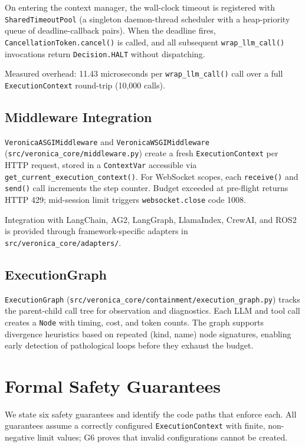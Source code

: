 \documentclass[11pt]{article}
\begin{document}
On entering the context manager, the wall-clock timeout is registered with
\texttt{SharedTimeoutPool} (a singleton daemon-thread scheduler with a
heap-priority queue of deadline-callback pairs). When the deadline fires,
\texttt{CancellationToken.cancel()} is called, and all subsequent
\texttt{wrap\_llm\_call()} invocations return \texttt{Decision.HALT} without
dispatching.

Measured overhead: 11.43 microseconds per \texttt{wrap\_llm\_call()} call
over a full \texttt{ExecutionContext} round-trip (10,000 calls).

\subsection{Middleware Integration}

\texttt{VeronicaASGIMiddleware} and \texttt{VeronicaWSGIMiddleware}
(\texttt{src/veronica\_core/middleware.py}) create a fresh
\texttt{ExecutionContext} per HTTP request, stored in a \texttt{ContextVar}
accessible via \texttt{get\_current\_execution\_context()}. For WebSocket
scopes, each \texttt{receive()} and \texttt{send()} call increments the step
counter. Budget exceeded at pre-flight returns HTTP 429; mid-session limit
triggers \texttt{websocket.close} code 1008.

Integration with LangChain, AG2, LangGraph, LlamaIndex, CrewAI, and ROS2 is
provided through framework-specific adapters in
\texttt{src/veronica\_core/adapters/}.

\subsection{ExecutionGraph}

\texttt{ExecutionGraph}
(\texttt{src/veronica\_core/containment/execution\_graph.py}) tracks the
parent-child call tree for observation and diagnostics. Each LLM and tool call
creates a \texttt{Node} with timing, cost, and token counts. The graph
supports divergence heuristics based on repeated (kind, name) node signatures,
enabling early detection of pathological loops before they exhaust the budget.

\section{Formal Safety Guarantees}
\label{sec:guarantees}

We state six safety guarantees and identify the code paths that enforce each.
All guarantees assume a correctly configured \texttt{ExecutionContext} with
finite, non-negative limit values; G6 proves that invalid configurations
cannot be created.
\end{document}
